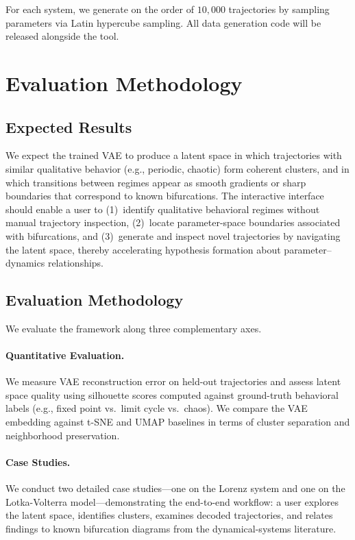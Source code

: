 \documentclass{article}
\begin{document}
For each system, we generate on the order of $10{,}000$ trajectories by
sampling parameters via Latin hypercube sampling. All data generation code will
be released alongside the tool.

\section{Evaluation Methodology}

\subsection{Expected Results}

We expect the trained VAE to produce a latent space in which trajectories with
similar qualitative behavior (e.g., periodic, chaotic) form coherent clusters,
and in which transitions between regimes appear as smooth gradients or sharp
boundaries that correspond to known bifurcations. The interactive interface
should enable a user to (1)~identify qualitative behavioral regimes without
manual trajectory inspection, (2)~locate parameter-space boundaries associated
with bifurcations, and (3)~generate and inspect novel trajectories by
navigating the latent space, thereby accelerating hypothesis formation about
parameter--dynamics relationships.

\subsection{Evaluation Methodology}

We evaluate the framework along three complementary axes.

\paragraph{Quantitative Evaluation.}
We measure VAE reconstruction error on held-out trajectories and assess latent
space quality using silhouette scores computed against ground-truth behavioral
labels (e.g., fixed point vs.\ limit cycle vs.\ chaos). We compare the VAE
embedding against t-SNE and UMAP baselines in terms of cluster separation and
neighborhood preservation.

\paragraph{Case Studies.}
We conduct two detailed case studies---one on the Lorenz system and one on the
Lotka-Volterra model---demonstrating the end-to-end workflow: a user explores
the latent space, identifies clusters, examines decoded trajectories, and
relates findings to known bifurcation diagrams from the dynamical-systems
literature.
\end{document}
